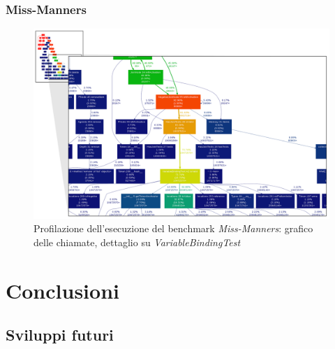 \subsubsection{Miss-Manners}




\begin{figure}
\centering
\includegraphics[width=1.3\textwidth, angle=270, viewport=0 0 718 456]{Immagini/Capitolo3/Profile-missmanners.pdf}
\caption[Profilazione dell'esecuzione del benchmark \emph{Miss-Manners}]{Profilazione dell'esecuzione del benchmark \emph{Miss-Manners}: grafico delle chiamate, dettaglio su \emph{VariableBindingTest}}\label{fig:profile-miss-manners}
\end{figure}


\section{Conclusioni}

\subsection{Sviluppi futuri}
